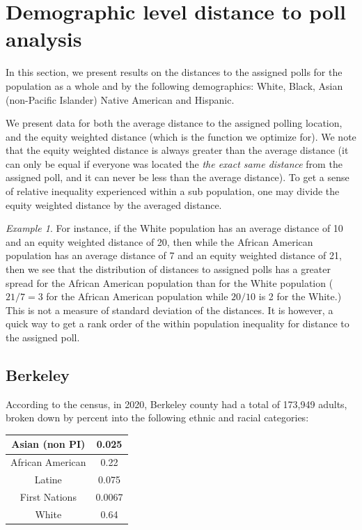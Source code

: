 \documentclass[11pt]{article}
\theoremstyle{remark}
\newtheorem{eg}[thm]{Example}
\theoremstyle{definition}
\begin{document}
\section{Demographic level distance to poll analysis \label{sec:distances}}
In this section, we present results on the distances to the assigned polls for the population as a whole and by the following demographics: White, Black, Asian (non-Pacific Islander) Native American and Hispanic.

We present data for both the average distance to the assigned polling location, and the equity weighted distance (which is the function we optimize for). We note that the equity weighted distance is always greater than the average distance (it can only be equal if everyone was located the \emph{the exact same distance} from the assigned poll, and it can never be less than the average distance). To get a sense of relative inequality experienced within a sub population, one may divide the equity weighted distance by the averaged distance. 
\begin{eg}
	For instance, if the White population has an average distance of 10 and an equity weighted distance of 20, then while the African American population has an average distance of 7 and an equity weighted distance of 21, then we see that the distribution of distances to assigned polls has a greater spread for the African American population than for the White population ($21/7 = 3$ for the African American population while $20/10$ is 2 for the White.) This is not a measure of standard deviation of the distances. It is however, a quick way to get a rank order of the within population inequality for distance to the assigned poll.
\end{eg}

\subsection{Berkeley \label{sec:Berkeley distances}}
According to the census, in 2020, Berkeley county had a total of 173,949 adults, broken down by percent into the following ethnic and racial categories:

\begin{tabular} {| c | c |} 
	\hline
	Asian (non PI) &  0.025 \\ \hline
	African American & 0.22 \\ \hline
	Latine & 0.075 \\ \hline
	First Nations & 0.0067 \\ \hline
	White  & 0.64 \\ \hline
\end{tabular}
\end{document}
